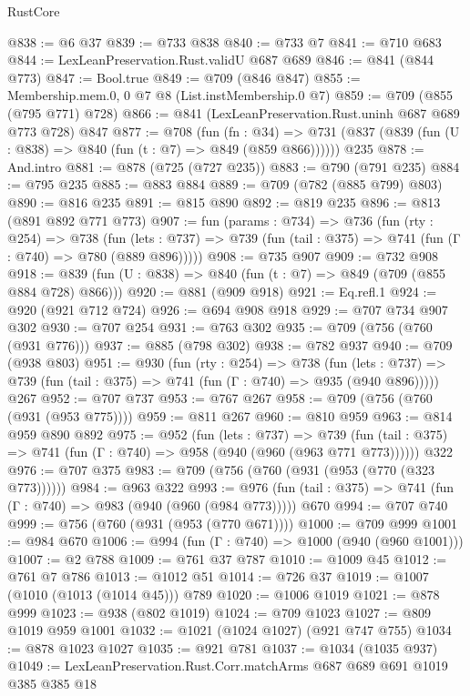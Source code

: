 \begin{lexlean}{RustCore}
\begin{coremodule}
@838 := @6 @37
@839 := @733 @838
@840 := @733 @7
@841 := @710 @683
@844 := LexLeanPreservation.Rust.validU @687 @689
@846 := @841 (@844 @773)
@847 := Bool.true
@849 := @709 (@846 @847)
@855 := Membership.mem.{0, 0} @7 @8 (List.instMembership.{0} @7)
@859 := @709 (@855 (@795 @771) @728)
@866 := @841 (LexLeanPreservation.Rust.uninh @687 @689 @773 @728) @847
@877 := @708
    (fun (fn : @34) =>
    @731 (@837 (@839 (fun (U : @838) => @840 (fun (t : @7) => @849 (@859 @866))))))
    @235
@878 := And.intro
@881 := @878 (@725 (@727 @235))
@883 := @790 (@791 @235)
@884 := @795 @235
@885 := @883 @884
@889 := @709 (@782 (@885 @799) @803)
@890 := @816 @235
@891 := @815 @890
@892 := @819 @235
@896 := @813 (@891 @892 @771 @773)
@907 := fun (params : @734) =>
  @736
    (fun (rty : @254) =>
    @738
      (fun (lets : @737) => @739 (fun (tail : @375) => @741 (fun (Γ : @740) => @780 (@889 @896)))))
@908 := @735 @907
@909 := @732 @908
@918 := @839 (fun (U : @838) => @840 (fun (t : @7) => @849 (@709 (@855 @884 @728) @866)))
@920 := @881 (@909 @918)
@921 := Eq.refl.{1}
@924 := @920 (@921 @712 @724)
@926 := @694 @908 @918
@929 := @707 @734 @907 @302
@930 := @707 @254
@931 := @763 @302
@935 := @709 (@756 (@760 (@931 @776)))
@937 := @885 (@798 @302)
@938 := @782 @937
@940 := @709 (@938 @803)
@951 := @930
    (fun (rty : @254) =>
    @738
      (fun (lets : @737) => @739 (fun (tail : @375) => @741 (fun (Γ : @740) => @935 (@940 @896)))))
    @267
@952 := @707 @737
@953 := @767 @267
@958 := @709 (@756 (@760 (@931 (@953 @775))))
@959 := @811 @267
@960 := @810 @959
@963 := @814 @959 @890 @892
@975 := @952
    (fun (lets : @737) =>
    @739 (fun (tail : @375) => @741 (fun (Γ : @740) => @958 (@940 (@960 (@963 @771 @773))))))
    @322
@976 := @707 @375
@983 := @709 (@756 (@760 (@931 (@953 (@770 (@323 @773))))))
@984 := @963 @322
@993 := @976 (fun (tail : @375) => @741 (fun (Γ : @740) => @983 (@940 (@960 (@984 @773))))) @670
@994 := @707 @740
@999 := @756 (@760 (@931 (@953 (@770 @671))))
@1000 := @709 @999
@1001 := @984 @670
@1006 := @994 (fun (Γ : @740) => @1000 (@940 (@960 @1001)))
@1007 := @2 @788
@1009 := @761 @37 @787
@1010 := @1009 @45
@1012 := @761 @7 @786
@1013 := @1012 @51
@1014 := @726 @37
@1019 := @1007 (@1010 (@1013 (@1014 @45))) @789
@1020 := @1006 @1019
@1021 := @878 @999
@1023 := @938 (@802 @1019)
@1024 := @709 @1023
@1027 := @809 @1019 @959 @1001
@1032 := @1021 (@1024 @1027) (@921 @747 @755)
@1034 := @878 @1023 @1027
@1035 := @921 @781
@1037 := @1034 (@1035 @937)
@1049 := LexLeanPreservation.Rust.Corr.matchArms
    @687
    @689
    @691
    @1019
    @385
    @385
    @18

\end{coremodule}
\end{lexlean}
